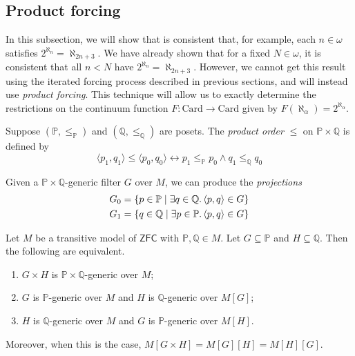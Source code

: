 \subsection{Product forcing}
In this subsection, we will show that is consistent that, for example, each \( n \in \omega \) satisfies \( 2^{\aleph_n} = \aleph_{2n + 3} \).
We have already shown that for a fixed \( N \in \omega \), it is consistent that all \( n < N \) have \( 2^{\aleph_n} = \aleph_{2n + 3} \).
However, we cannot get this result using the iterated forcing process described in previous sections, and will instead use \emph{product forcing}.
This technique will allow us to exactly determine the restrictions on the continuum function \( F : \mathrm{Card} \to \mathrm{Card} \) given by \( F(\aleph_\alpha) = 2^{\aleph_\alpha} \).
\begin{definition}
    Suppose \( (\mathbb P, \leq_{\mathbb P}) \) and \( (\mathbb Q, \leq_{\mathbb Q}) \) are posets.
    The \emph{product order} \( \leq \) on \( \mathbb P \times \mathbb Q \) is defined by
    \[ \langle p_1, q_1 \rangle \leq \langle p_0, q_0 \rangle \leftrightarrow p_1 \leq_{\mathbb P} p_0 \wedge q_1 \leq_{\mathbb Q} q_0 \]
\end{definition}
Given a \( \mathbb P \times \mathbb Q \)-generic filter \( G \) over \( M \), we can produce the \emph{projections}
\begin{align*}
    G_0 &= \qty{p \in \mathbb P \mid \exists q \in \mathbb Q.\, \langle p, q \rangle \in G} \\
    G_1 &= \qty{q \in \mathbb Q \mid \exists p \in \mathbb P.\, \langle p, q \rangle \in G}
\end{align*}
\begin{lemma}
    Let \( M \) be a transitive model of \( \mathsf{ZFC} \) with \( \mathbb P, \mathbb Q \in M \).
    Let \( G \subseteq \mathbb P \) and \( H \subseteq \mathbb Q \).
    Then the following are equivalent.
    \begin{enumerate}
        \item \( G \times H \) is \( \mathbb P \times \mathbb Q \)-generic over \( M \);
        \item \( G \) is \( \mathbb P \)-generic over \( M \) and \( H \) is \( \mathbb Q \)-generic over \( M[G] \);
        \item \( H \) is \( \mathbb Q \)-generic over \( M \) and \( G \) is \( \mathbb P \)-generic over \( M[H] \).
    \end{enumerate}
    Moreover, when this is the case, \( M[G \times H] = M[G][H] = M[H][G] \).
\end{lemma}

